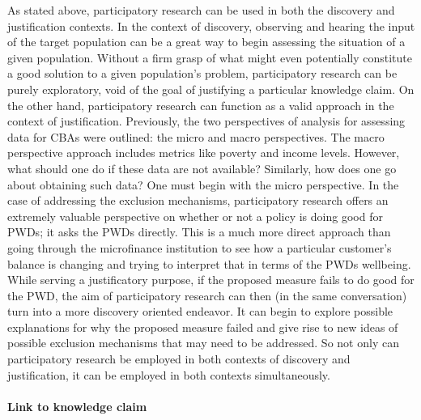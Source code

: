 \documentclass[a4paper]{article}
\begin{document}
As stated above, participatory research can be used in both the discovery and
justification contexts. In the context of discovery, observing and hearing the
input of the target population can be a great way to begin assessing the
situation of a given population. Without a firm grasp of what might even
potentially constitute a good solution to a given population's problem,
participatory research can be purely exploratory, void of the goal of
justifying a particular knowledge claim. On the other hand, participatory
research can function as a valid approach in the context of justification.
Previously, the two perspectives of analysis for assessing data for CBAs were
outlined: the micro and macro perspectives. The macro perspective approach
includes metrics like poverty and income levels. However, what should one do
if these data are not available? Similarly, how does one go about obtaining
such data? One must begin with the micro perspective. In the case of
addressing the exclusion mechanisms, participatory research offers an
extremely valuable perspective on whether or not a policy is doing good for
PWDs; it asks the PWDs directly. This is a much more direct approach than
going through the microfinance institution to see how a particular customer's
balance is changing and trying to interpret that in terms of the PWDs
wellbeing. While serving a justificatory purpose, if the proposed measure
fails to do good for the PWD, the aim of participatory research can then (in
the same conversation) turn into a more discovery oriented endeavor. It can
begin to explore possible explanations for why the proposed measure failed and
give rise to new ideas of possible exclusion mechanisms that may need to be
addressed. So not only can participatory research be employed in both contexts
of discovery and justification, it can be employed in both contexts
simultaneously.


\paragraph{Link to knowledge claim}
\end{document}
